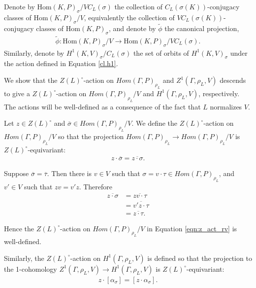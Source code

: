 	\begin{definition}
		Denote by $\mathrm{Hom}(K, P)_\sigma/VC_L(\sigma)$ the collection of $C_L(\sigma(K))$-conjugacy classes of $\mathrm{Hom}(K, P)_\sigma/V$, equivalently the collection of $VC_L(\sigma(K))$-conjugacy classes of $\mathrm{Hom}(K, P)_\sigma$, and denote by $\widetilde{\phi}$ the canonical projection,
		\begin{align*}
			\widetilde{\phi}: \mathrm{Hom}(K, P)_\sigma/V \rightarrow \mathrm{Hom}(K, P)_\sigma/VC_L(\sigma).
		\end{align*}
		Similarly, denote by $H^1(K, V)_\sigma/C_L(\sigma)$ the set of orbits of $H^1(K, V)_\sigma$ under the action defined in Equation \ref{cl.h1}.
	\end{definition}

We show that the $Z(L)^\circ$-action on $Hom(\Gamma, P)_{\rho_L}$ and $Z^1(\Gamma, \rho_L, V)$ descends to give a $Z(L)^\circ$-action on $Hom(\Gamma, P)_{\rho_L}/V$ and $H^1(\Gamma, \rho_L, V)$, respectively. The actions will be well-defined as a consequence of the fact that $L$ normalizes $V$.

Let $z \in Z(L)^\circ$ and $\overline{\sigma} \in Hom(\Gamma, P)_{\rho_L}/V$. We define the $Z(L)^\circ$-action on $Hom(\Gamma, P)_{\rho_L}/V$ so that the projection $Hom(\Gamma, P)_{\rho_L} \rightarrow Hom(\Gamma, P)_{\rho_L}/V$ is $Z(L)^\circ$-equivariant:
\begin{align}
  z \cdot \overline{\sigma} = \overline{z \cdot \sigma}.
  \label{eqn:z_act_rv}
\end{align}

Suppose $\overline{\sigma} = \overline{\tau}$. Then there is $v \in V$ such that $\sigma = v \cdot \tau \in Hom(\Gamma, P)_{\rho_L}$, and $v' \in V$ such that $zv = v' z$. Therefore
\begin{align*}
  \overline{z \cdot \sigma} &= \overline{zv \cdot \tau} \\
  &= \overline{v' z \cdot \tau} \\
  &= \overline{z \cdot \tau}.
\end{align*}

Hence the $Z(L)^\circ$-action on $Hom(\Gamma, P)_{\rho_L}/V$ in Equation \ref{eqn:z_act_rv} is well-defined.

Similarly, the $Z(L)^\circ$-action on $H^1(\Gamma, \rho_L, V)$ is defined so that the projection to the 1-cohomology $Z^1(\Gamma, \rho_L, V) \rightarrow H^1(\Gamma, \rho_L, V)$ is $Z(L)^\circ$-equivariant:
\begin{align}
  z \cdot [\alpha_\sigma] = [z \cdot \alpha_\sigma].
  \label{eqn:z_act_h}
\end{align}

